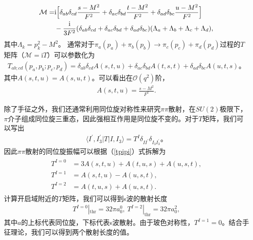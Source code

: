 \documentclass[aps,tightenlines,16pt]{ctexart}
\numberwithin{equation}{section}
\begin{document}
\begin{align}
   \begin{aligned}
   \mathcal{M} =& \mbox{i}\Bigl[\delta_{ab}\delta_{cd}\frac{s-M^2}{F^2}+\delta_{ac}\delta_{bd}\frac{t-M^2}{F^2}+\delta_{ad}\delta_{bc}\frac{u-M^2}{F^2}\Bigr]
   \\
   & - \frac{\mbox{i}}{3F^2}(\delta_{ab}\delta_{cd}+\delta_{ac}\delta_{bd}+\delta_{ad}\delta_{bc})(\Lambda_a+\Lambda_b+\Lambda_c+\Lambda_d),
\end{aligned}
\end{align}
其中$\Lambda_k=p_k^2-M^2$。
通常对于$\pi_a(p_a)+\pi_b(p_b)\to \pi_c(p_c)+\pi_d(p_d)$过程的$T$矩阵（$\mathcal{M}=\mbox{i}T$）可以参数化为
\begin{align}\label{tpipi}
   T_{ab;cd}(p_a,p_b;p_c,p_d)=\delta_{ab}\delta_{cd}A(s,t,u)+\delta_{ac}\delta_{bd}A(t,s,t)+\delta_{ad}\delta_{bc}A(u,t,s)。
\end{align}
其中$A(s,t,u)=A(s,u,t)$。可以看出在$\mathcal{O}(q^2)$阶，
\begin{align}
   A(s,t,u)=\frac{s-M^2}{F^2}.
\end{align}



除了手征之外，我们还通常利用同位旋对称性来研究$\pi\pi$散射，在$SU(2)$极限下，$\pi$介子组成同位旋三重态，因此强相互作用是同位旋不变的。对于$T$矩阵，我们可以写出
\begin{align}
   \langle I^{\prime},I^{\prime}_3|T|I,I_3\rangle = T^I \delta_{II^{\prime}}\delta_{I_3I_3^{\prime}}。
\end{align}
因此$\pi\pi$散射的同位旋振幅可以根据（\ref{tpipi}）式拆解为\cite{GASSER1984142}
\begin{align}
   \begin{aligned}
   T^{I=0}&=3A(s,t,u)+A(t,u,s)+A(u,s,t),\\
   T^{I=1}&=A(s,t,u)-A(u,s,t),\\
   T^{I=2}&=A(t,u,s)+A(u,s,t).
   \end{aligned}
\end{align}
计算开启域附近的$T$矩阵，我们可以得到s波的散射长度
\begin{align}\label{a}
   T^{I=0}|_{\text{thr}} = 32\pi a_0^0,\ T^{I=2}|_{\text{thr}}=32\pi a_0^2,
\end{align}
其中$a$的上标代表同位旋，下标代表s波散射。由于玻色对称性，$T^{I=1}=0$。结合手征理论，我们可以得到两个散射长度的值。
\end{document}
